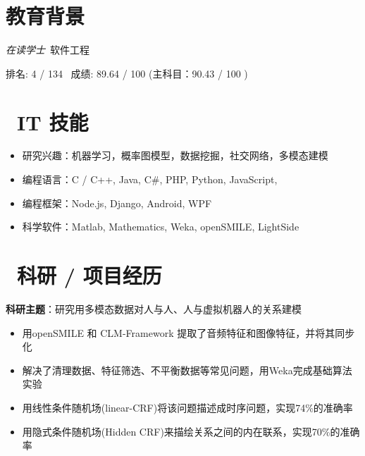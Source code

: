 \documentclass{resume}
\begin{document}


 
\section{\faGraduationCap 教育背景}
\textit{在读学士}\ 软件工程

排名: 4 / 134 \ 成绩: 89.64 / 100 (主科目：90.43 / 100 )


\section{\faCogs\ IT 技能}
\begin{itemize}[parsep=0.5ex]
  \item 研究兴趣：机器学习，概率图模型，数据挖掘，社交网络，多模态建模
  \item 编程语言：C / C++, Java, C\#, PHP, Python, JavaScript,
  \item 编程框架：Node.js, Django, Android, WPF
  \item 科学软件：Matlab, Mathematics, Weka, openSMILE, LightSide
\end{itemize}


\section{\faUsers\ 科研 / 项目经历}
\textbf{科研主题}：研究用多模态数据对人与人、人与虚拟机器人的关系建模
\begin{itemize}
\item 用openSMILE 和 CLM-Framework 提取了音频特征和图像特征，并将其同步化
\item 解决了清理数据、特征筛选、不平衡数据等常见问题，用Weka完成基础算法实验
\item 用线性条件随机场(linear-CRF)将该问题描述成时序问题，实现74\%的准确率
\item 用隐式条件随机场(Hidden CRF)来描绘关系之间的内在联系，实现70\%的准确率
\end{itemize}
\end{document}
